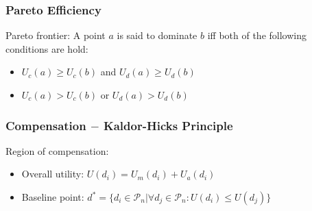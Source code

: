 \documentclass[14pt]{beamer}
\begin{document}
\begin{frame}\frametitle{Pareto Efficiency}

Pareto frontier: A point $a$ is said to dominate $b$ iff both of the following conditions are hold:

\begin{itemize}
\item $U_c(a)\ge U_c(b)$ and $U_d(a)\ge U_d(b)$
\item $U_c(a) > U_c(b)$ or $U_d(a) > U_d(b)$
\end{itemize}



\end{frame}

\begin{frame}\frametitle{Compensation $-$ Kaldor-Hicks Principle}

Region of compensation:

\begin{itemize}
\item Overall utility: $U(d_i)=U_m(d_i)+U_a(d_i)$
\item Baseline point: $d^*=\{d_i\in\mathcal{P}_n | \forall d_j\in\mathcal{P}_n: U(d_i)\leq U(d_j)\}$
\end{itemize}



\end{frame}
\end{document}
